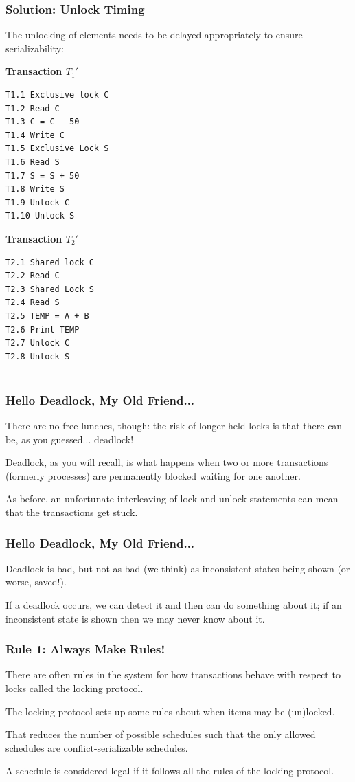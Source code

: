 \begin{frame}[fragile]
\frametitle{Solution: Unlock Timing}

The unlocking of elements needs to be delayed appropriately to ensure serializability: 

\begin{multicols}{2}
\textbf{Transaction $T_{1}'$}
\begin{verbatim}
T1.1 Exclusive lock C
T1.2 Read C
T1.3 C = C - 50
T1.4 Write C
T1.5 Exclusive Lock S
T1.6 Read S
T1.7 S = S + 50
T1.8 Write S
T1.9 Unlock C
T1.10 Unlock S
\end{verbatim}

\columnbreak
\textbf{Transaction $T_{2}'$}
\begin{verbatim}
T2.1 Shared lock C
T2.2 Read C
T2.3 Shared Lock S
T2.4 Read S
T2.5 TEMP = A + B
T2.6 Print TEMP
T2.7 Unlock C
T2.8 Unlock S


\end{verbatim}
\end{multicols}


\end{frame}

\begin{frame}
\frametitle{Hello Deadlock, My Old Friend...}

There are no free lunches, though: the risk of longer-held locks is that there can be, as you guessed... \alert{deadlock}! 

Deadlock, as you will recall, is what happens when two or more transactions (formerly processes) are permanently blocked waiting for one another. 

As before, an unfortunate interleaving of lock and unlock statements can mean that the transactions get stuck. 

\end{frame}

\begin{frame}
\frametitle{Hello Deadlock, My Old Friend...}

Deadlock is bad, but not as bad (we think) as inconsistent states being shown (or worse, saved!). 

If a deadlock occurs, we can detect it and then can do something about it; if an inconsistent state is shown then we may never know about it.


\end{frame}

\begin{frame}
\frametitle{Rule 1: Always Make Rules!}

There are often rules in the system for how transactions behave with respect to locks called the \alert{locking protocol}. 

The locking protocol sets up some rules about when items may be (un)locked.

That reduces the number of possible schedules such that the only allowed schedules are conflict-serializable schedules. 

A schedule is considered legal if it follows all the rules of the locking protocol.

\end{frame}

